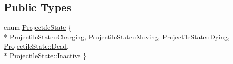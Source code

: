\subsection*{Public Types}
\begin{DoxyCompactItemize}
\item 
enum \hyperlink{classZeta_1_1Projectile_aacad4e6f44c0a40539f4ec22ac93ee27}{Projectile\+State} \{ \\*
\hyperlink{classZeta_1_1Projectile_aacad4e6f44c0a40539f4ec22ac93ee27ad7b54fc61b65b19c4694a29b6044aacd}{Projectile\+State\+::\+Charging}, 
\hyperlink{classZeta_1_1Projectile_aacad4e6f44c0a40539f4ec22ac93ee27adefe967ad0373b2274fc298f19125ca7}{Projectile\+State\+::\+Moving}, 
\hyperlink{classZeta_1_1Projectile_aacad4e6f44c0a40539f4ec22ac93ee27a2ef54119c1f0d131a1a60e7776fa78f0}{Projectile\+State\+::\+Dying}, 
\hyperlink{classZeta_1_1Projectile_aacad4e6f44c0a40539f4ec22ac93ee27a183b62c7f067711f9c5a54913c054617}{Projectile\+State\+::\+Dead}, 
\\*
\hyperlink{classZeta_1_1Projectile_aacad4e6f44c0a40539f4ec22ac93ee27a3cab03c00dbd11bc3569afa0748013f0}{Projectile\+State\+::\+Inactive}
 \}
\end{DoxyCompactItemize}

